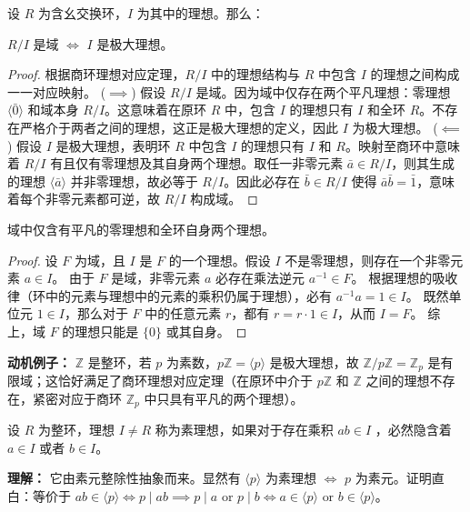 \documentclass[11pt]{article}
\begin{document}
\begin{cntheorem}
设 $R$ 为含幺交换环，$I$ 为其中的理想。那么：
\begin{center}
    $R/I$ 是域 $\iff$ $I$ 是极大理想。
\end{center}
\end{cntheorem}
\begin{proof}
根据商环理想对应定理，$R/I$ 中的理想结构与 $R$ 中包含 $I$ 的理想之间构成一一对应映射。
($\implies$) 假设 $R/I$ 是域。因为域中仅存在两个平凡理想：零理想 $\langle \bar{0} \rangle$ 和域本身 $R/I$。这意味着在原环 $R$ 中，包含 $I$ 的理想只有 $I$ 和全环 $R$。不存在严格介于两者之间的理想，这正是极大理想的定义，因此 $I$ 为极大理想。
($\impliedby$) 假设 $I$ 是极大理想，表明环 $R$ 中包含 $I$ 的理想只有 $I$ 和 $R$。映射至商环中意味着 $R/I$ 有且仅有零理想及其自身两个理想。取任一非零元素 $\bar{a} \in R/I$，则其生成的理想 $\langle \bar{a} \rangle$ 并非零理想，故必等于 $R/I$。因此必存在 $\bar{b} \in R/I$ 使得 $\bar{a}\bar{b} = \bar{1}$，意味着每个非零元素都可逆，故 $R/I$ 构成域。
\end{proof}

\begin{cnproperty}
域中仅含有平凡的零理想和全环自身两个理想。
\end{cnproperty}
\begin{proof}
设 $F$ 为域，且 $I$ 是 $F$ 的一个理想。假设 $I$ 不是零理想，则存在一个非零元素 $a \in I$。
由于 $F$ 是域，非零元素 $a$ 必存在乘法逆元 $a^{-1} \in F$。
根据理想的吸收律（环中的元素与理想中的元素的乘积仍属于理想），必有 $a^{-1}a = 1 \in I$。
既然单位元 $1 \in I$，那么对于 $F$ 中的任意元素 $r$，都有 $r = r \cdot 1 \in I$，从而 $I = F$。
综上，域 $F$ 的理想只能是 $\{0\}$ 或其自身。
\end{proof}

\noindent \textbf{动机例子：} $\mathbb{Z}$ 是整环，若 $p$ 为素数，$p\mathbb{Z} = \langle p \rangle$ 是极大理想，故 $\mathbb{Z}/p\mathbb{Z} = \mathbb{Z}_p$ 是有限域；这恰好满足了商环理想对应定理（在原环中介于 $p\mathbb{Z}$ 和 $\mathbb{Z}$ 之间的理想不存在，紧密对应于商环 $\mathbb{Z}_p$ 中只具有平凡的两个理想）。

\begin{cndefinition}[素理想]
设 $R$ 为整环，理想 $I \neq R$ 称为素理想，如果对于存在乘积 $ab \in I$ ，必然隐含着 $a \in I$ 或者 $b \in I$。
\end{cndefinition}
\noindent \textbf{理解：} 它由素元整除性抽象而来。显然有 $\langle p\rangle$ 为素理想 $\iff$ $p$ 为素元。证明直白：等价于 $ab \in \langle p\rangle \iff p \mid ab \implies p\mid a \text{ or } p\mid b \iff a \in \langle p\rangle \text{ or } b\in \langle p\rangle$。
\end{document}
